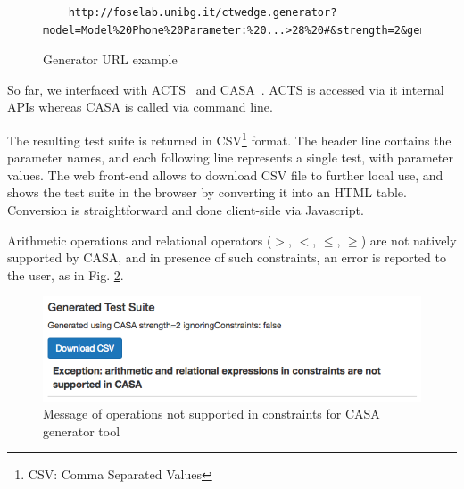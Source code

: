 \begin{tikzborder}{\cite{Gargantini16:validation}}
\begin{tikzborder}{\cite{gargantini_combinatorial_2017}}
\begin{tikzborder}{\cite{gargantini_combinatorial_2017}}
\begin{tikzborder}{\cite{garn2019}}
\begin{tikzborder}{\cite{arcaini2019achieving}}
\begin{figure}[htb!] %
	\centering
	\begin{lstlisting}
	http://foselab.unibg.it/ctwedge.generator?model=Model%20Phone%20Parameter:%20...>28%20#&strength=2&generator=acts&ignConstr=false	
	\end{lstlisting}
	\caption{Generator URL example}
	\label{fig:urlexample}
\end{figure}

\begin{tikzborder}{}
So far, we interfaced \ctwedge with ACTS~\cite{ACTS} and CASA~\cite{CASAwebsite}. ACTS is accessed  via it internal APIs whereas CASA is called via command line.

The resulting test suite is returned in CSV\footnote{CSV: Comma Separated Values} format. The header line contains the parameter names, and each following line represents a single test, with parameter values.
The web front-end allows to download CSV file to further local use, and shows the test suite in the browser by converting it into an HTML table. Conversion is straightforward and done client-side via Javascript.

Arithmetic operations and relational operators ($>$, $<$, $\le$, $\ge$) are not natively supported by CASA, and in presence of such constraints, an error is reported to the user, as in Fig. \ref{fig:casaError}.
\end{tikzborder}

\begin{figure}[hbt!]
	\centering
	\includegraphics[width=\columnwidth]{images/casaError.png}
	\caption{Message of operations not supported in constraints for CASA generator tool}\label{fig:casaError}
\end{figure}


\end{tikzborder}
\end{tikzborder}
\end{tikzborder}
\end{tikzborder}
\end{tikzborder}
